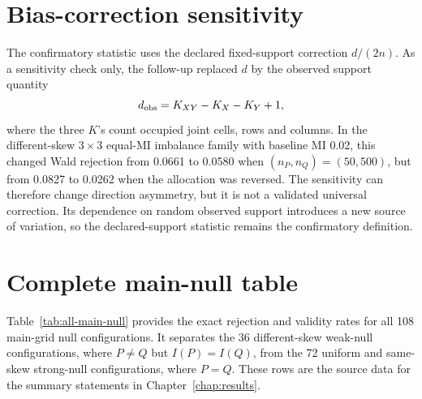 \section{Bias-correction sensitivity}

The confirmatory statistic uses the declared fixed-support correction
\(d/(2n)\). As a sensitivity check only, the follow-up replaced \(d\) by
the observed support quantity
\begin{equation}
  d_{\rm obs}=K_{XY}-K_X-K_Y+1,
\end{equation}
where the three \(K\)'s count occupied joint cells, rows and columns. In the
different-skew \(3\times3\) equal-MI imbalance family with baseline MI 0.02,
this changed Wald rejection from 0.0661 to 0.0580 when
\((n_P,n_Q)=(50,500)\), but from 0.0827 to 0.0262 when the allocation was
reversed. The sensitivity can therefore change direction asymmetry, but it
is not a validated universal correction. Its dependence on random observed
support introduces a new source of variation, so the declared-support
statistic remains the confirmatory definition.

\section{Complete main-null table}

Table~\ref{tab:all-main-null} provides the exact rejection and validity rates
for all 108 main-grid null configurations. It separates the 36 different-skew
weak-null configurations, where \(P\ne Q\) but \(I(P)=I(Q)\), from the 72
uniform and same-skew strong-null configurations, where \(P=Q\). These rows
are the source data for the summary statements in Chapter~\ref{chap:results}.


